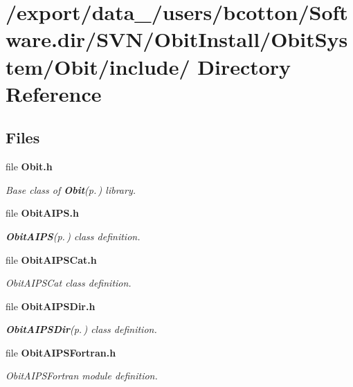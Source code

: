 \section{/export/data\_/users/bcotton/Software.dir/SVN/Obit\-Install/Obit\-System/Obit/include/ Directory Reference}
\label{dir_000001}
\subsection*{Files}
\begin{CompactItemize}
\item 
file {\bf Obit.h}
\begin{CompactList}\small\item\em Base class of {\bf Obit}{\rm (p.\,\pageref{structObit})} library. \item\end{CompactList}

\item 
file {\bf Obit\-AIPS.h}
\begin{CompactList}\small\item\em {\bf Obit\-AIPS}{\rm (p.\,\pageref{structObitAIPS})} class definition. \item\end{CompactList}

\item 
file {\bf Obit\-AIPSCat.h}
\begin{CompactList}\small\item\em Obit\-AIPSCat class definition. \item\end{CompactList}

\item 
file {\bf Obit\-AIPSDir.h}
\begin{CompactList}\small\item\em {\bf Obit\-AIPSDir}{\rm (p.\,\pageref{structObitAIPSDir})} class definition. \item\end{CompactList}

\item 
file {\bf Obit\-AIPSFortran.h}
\begin{CompactList}\small\item\em Obit\-AIPSFortran module definition. \item\end{CompactList}


\end{CompactItemize}

